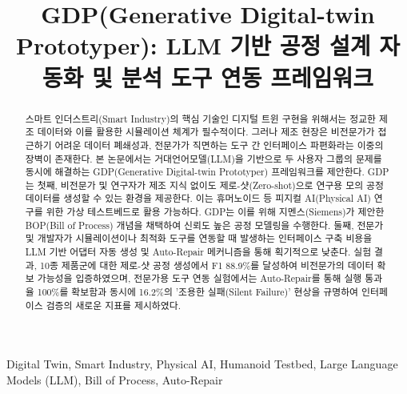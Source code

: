 \documentclass[conference]{IEEEtran}
\begin{document}
\title{GDP(Generative Digital-twin Prototyper): LLM 기반 공정 설계 자동화 및 분석 도구 연동 프레임워크}

\author{
\and
{}
}

\maketitle

\begin{abstract}
스마트 인더스트리(Smart Industry)의 핵심 기술인 디지털 트윈 구현을 위해서는 정교한 제조 데이터와 이를 활용한 시뮬레이션 체계가 필수적이다. 그러나 제조 현장은 비전문가가 접근하기 어려운 데이터 폐쇄성과, 전문가가 직면하는 도구 간 인터페이스 파편화라는 이중의 장벽이 존재한다. 본 논문에서는 거대언어모델(LLM)을 기반으로 두 사용자 그룹의 문제를 동시에 해결하는 GDP(Generative Digital-twin Prototyper) 프레임워크를 제안한다. GDP는 첫째, 비전문가 및 연구자가 제조 지식 없이도 제로-샷(Zero-shot)으로 연구용 모의 공정 데이터를 생성할 수 있는 환경을 제공한다. 이는 휴머노이드 등 피지컬 AI(Physical AI) 연구를 위한 가상 테스트베드로 활용 가능하다. GDP는 이를 위해 지멘스(Siemens)가 제안한 BOP(Bill of Process) 개념을 채택하여 신뢰도 높은 공정 모델링을 수행한다. 둘째, 전문가 및 개발자가 시뮬레이션이나 최적화 도구를 연동할 때 발생하는 인터페이스 구축 비용을 LLM 기반 어댑터 자동 생성 및 Auto-Repair 메커니즘을 통해 획기적으로 낮춘다. 실험 결과, 10종 제품군에 대한 제로-샷 공정 생성에서 F1 88.9\%를 달성하여 비전문가의 데이터 확보 가능성을 입증하였으며, 전문가용 도구 연동 실험에서는 Auto-Repair를 통해 실행 통과율 100\%를 확보함과 동시에 16.2\%의 '조용한 실패(Silent Failure)' 현상을 규명하여 인터페이스 검증의 새로운 지표를 제시하였다.
\end{abstract}

\begin{IEEEkeywords}
Digital Twin, Smart Industry, Physical AI, Humanoid Testbed, Large Language Models (LLM), Bill of Process, Auto-Repair
\end{IEEEkeywords}

\end{document}
